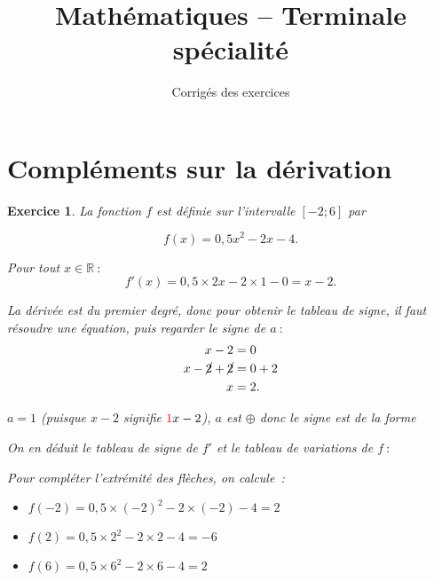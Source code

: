 \documentclass[10pt]{article}
\title{Mathématiques -- Terminale spécialité}
\date{Corrigés des exercices}
\newtheorem{exo}{Exercice}
\begin{document}
\setlength\parindent{0mm}
\renewcommand \footrulewidth{.2pt}

\maketitle

\tableofcontents


\newpage

\section{Compléments sur la dérivation}


\begin{exo}

La fonction $f$ est définie sur l'intervalle $\left[-2;6\right]$ par

\[ f(x) = 0,5x^2-2x-4.\]

\medskip

Pour tout $x\in\mathbb{R}~:$
\[f'(x)=0,5\times 2x-2\times 1-0=x-2.\]

La dérivée est du premier degré, donc pour obtenir le tableau de signe, il faut résoudre une équation, puis regarder le signe de $a~:$
\begin{align*}x-2&=0\\
 x-\cancel{2}+\cancel{2}&=0+2\\
 x&=2.
 \end{align*}

$a=1$ (puisque $x-2$ signifie $\textcolor{red}{1}x-2$), $a$ est $\oplus$ donc le signe est de la forme \fbox{$-~\upphi~+$}

\medskip


On en déduit le tableau de signe de $f'$ et le tableau de variations de $f~:$


\medskip

\setlength{\columnseprule}{1pt}

\begin{multicols}{2}

\begin{center}
\end{center}

\columnbreak

Pour compléter l'extrémité des flèches, on calcule~:

\begin{itemize}
\item[\textbullet] $f(-2)=0,5\times (-2)^2-2\times (-2)-4=2$
\item[\textbullet] $f(2)=0,5\times 2^2-2\times 2-4=-6$
\item[\textbullet] $f(6)=0,5\times 6^2-2\times 6-4=2$
\end{itemize}


\end{multicols}
\end{exo}
\end{document}
